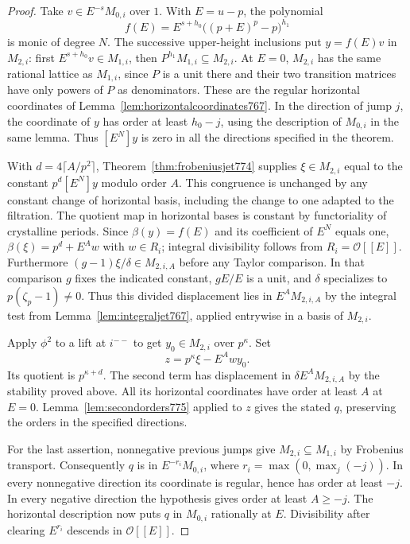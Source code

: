 \documentclass[a4paper,11pt]{article}
\theoremstyle{definition}
\theoremstyle{remark}
\numberwithin{equation}{section}
\begin{document}
\begin{proof}
Take \(v\in E^{-s}M_{0,i}\) over \(1\). With \(E=u-p\),
the polynomial
\[
          f(E)=E^{s+h_0}\big((p+E)^p-p\big)^{h_1}
\]
is monic of degree \(N\). The successive upper-height
inclusions put \(y=f(E)v\) in \(M_{2,i}\): first
\(E^{s+h_0}v\in M_{1,i}\), then
\(P^{h_1}M_{1,i}\subseteq M_{2,i}\). At \(E=0\), \(M_{2,i}\)
has the same rational lattice as \(M_{1,i}\), since \(P\)
is a unit there and their two transition matrices have
only powers of \(P\) as denominators. These are the regular
horizontal coordinates of Lemma~\ref{lem:horizontalcoordinates767}.
In the direction of jump \(j\), the coordinate of \(y\)
has order at least \(h_0-j\), using the description of
\(M_{0,i}\) in the same lemma. Thus \([E^N]y\) is zero
in all the directions specified in the theorem.

With \(d=4\lceil A/p^2\rceil\),
Theorem~\ref{thm:frobeniusjet774} supplies \(\xi\in M_{2,i}\)
equal to the constant \(p^d[E^N]y\) modulo order \(A\).
This congruence is unchanged by any constant change of
horizontal basis, including the change to one adapted to
the filtration. The quotient map in horizontal bases is
constant by functoriality of crystalline periods. Since
\(\beta(y)=f(E)\) and its coefficient of \(E^N\) equals
one, \(\beta(\xi)=p^d+E^A w\) with \(w\in R_i\);
integral divisibility follows from \(R_i=\mathcal O[[E]]\).
Furthermore \((g-1)\xi/\delta\in M_{2,i,A}\) before any
Taylor comparison. In that comparison \(g\) fixes the
indicated constant, \(gE/E\) is a unit, and \(\delta\)
specializes to \(p(\zeta_p-1)\ne0\). Thus this divided
displacement lies in \(E^A M_{2,i,A}\) by the integral
test from Lemma~\ref{lem:integraljet767}, applied entrywise
in a basis of \(M_{2,i}\).

Apply \(\phi^2\) to a lift at \(i^{--}\) to get
\(y_0\in M_{2,i}\) over \(p^\kappa\). Set
\[
                   z=p^\kappa\xi-E^A w y_0 .
\]
Its quotient is \(p^{\kappa+d}\). The second term has
displacement in \(\delta E^A M_{2,i,A}\) by the stability
proved above. All its horizontal coordinates have order
at least \(A\) at \(E=0\). Lemma~\ref{lem:secondorders775}
applied to \(z\) gives the stated \(q\), preserving the
orders in the specified directions.

For the last assertion, nonnegative previous jumps give
\(M_{2,i}\subseteq M_{1,i}\) by Frobenius transport.
Consequently \(q\) is in \(E^{-r_i}M_{0,i}\), where
\(r_i=\max(0,\max_j(-j))\). In every nonnegative direction
its coordinate is regular, hence has order at least \(-j\).
In every negative direction the hypothesis gives order
at least \(A\ge-j\). The horizontal description now puts
\(q\) in \(M_{0,i}\) rationally at \(E\). Divisibility after
clearing \(E^{r_i}\) descends in \(\mathcal O[[E]]\).
\end{proof}
\clearpage
\end{document}
